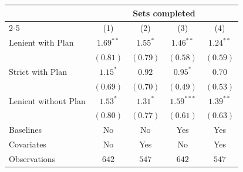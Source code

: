 \begin{tabular}{l c c c c}
\toprule
 & \multicolumn{4}{c}{Sets completed} \\
\cmidrule(lr){2-5}
 & (1) & (2) & (3) & (4) \\
\midrule
Lenient with Plan    & $1.69^{**}$ & $1.55^{*}$ & $1.46^{**}$  & $1.24^{**}$ \\
                     & $(0.81)$    & $(0.79)$   & $(0.58)$     & $(0.59)$    \\
Strict with Plan     & $1.15^{*}$  & $0.92$     & $0.95^{*}$   & $0.70$      \\
                     & $(0.69)$    & $(0.70)$   & $(0.49)$     & $(0.53)$    \\
Lenient without Plan & $1.53^{*}$  & $1.31^{*}$ & $1.59^{***}$ & $1.39^{**}$ \\
                     & $(0.80)$    & $(0.77)$   & $(0.61)$     & $(0.63)$    \\
\midrule
Baselines            & No          & No         & Yes          & Yes         \\
Covariates           & No          & Yes        & No           & Yes         \\
Observations            & $642$       & $547$      & $642$        & $547$       \\
\bottomrule
\end{tabular}
